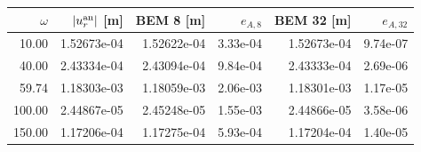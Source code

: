\begin{tabular}{rrrrrr}
\toprule
$\omega$ & $|u_r^{\rm an}|$ [m] & BEM 8 [m] & $e_{A,8}$ & BEM 32 [m] & $e_{A,32}$\\
\midrule
10.00 & 1.52673e-04 & 1.52622e-04 & 3.33e-04 & 1.52673e-04 & 9.74e-07\\
40.00 & 2.43334e-04 & 2.43094e-04 & 9.84e-04 & 2.43333e-04 & 2.69e-06\\
59.74 & 1.18303e-03 & 1.18059e-03 & 2.06e-03 & 1.18301e-03 & 1.17e-05\\
100.00 & 2.44867e-05 & 2.45248e-05 & 1.55e-03 & 2.44866e-05 & 3.58e-06\\
150.00 & 1.17206e-04 & 1.17275e-04 & 5.93e-04 & 1.17204e-04 & 1.40e-05\\
\bottomrule
\end{tabular}
